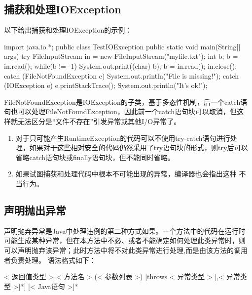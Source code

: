 \subsection{捕获和处理IOException}

以下给出捕获和处理IOException的示例：


\begin{javaCode}
import java.io.*;
public class TestIOException {
  public static void main(String[] args) {
    try {
      FileInputStream in = new FileInputStream("myfile.txt");
      int b;
      b = in.read();
      while(b != -1) {
        System.out.print((char) b);
        b = in.read();
      }
      in.close();
    } catch (FileNotFoundException e) {
      System.out.println("File is missing!");
    } catch (IOException e) {
      e.printStackTrace();
    }
    System.out.println("It's ok!");
  }
}
\end{javaCode}

FileNotFoundException是IOException的子类，基于多态性机制，后一个catch语
句也可以处理FileNotFoundException，因此前一个catch语句块可以取消，但这
样就无法区分是“文件不存在”引发异常或其他I/O异常了。


\begin{enumerate}
\item 对于只可能产生RuntimeException的代码可以不使用try-catch语句进行处
  理，如果对于这些相对安全的代码仍然采用了try语句块的形式，则try后可以
  省略catch语句块或finally语句块，但不能同时省略。
\item 如果试图捕获和处理代码中根本不可能出现的异常，编译器也会指出这种
  不当行为。
\end{enumerate}

\subsection{声明抛出异常}
 
声明抛弃异常是Java中处理违例的第二种方式如果。一个方法中的代码在运行时
可能生成某种异常，但在本方法中不必、或者不能确定如何处理此类异常时，则
可以声明抛弃该异常；此时方法中将不对此类异常进行处理,而是由该方法的调用
者负责处理。 语法格式如下：

\begin{javaCode}
  [< 修饰符 >] < 返回值类型 > < 方法名 > (< 参数列表 >) [throws < 异常类型 > [,< 异常类型 >]*] {
    [< Java语句 >]*
  }
\end{javaCode}

